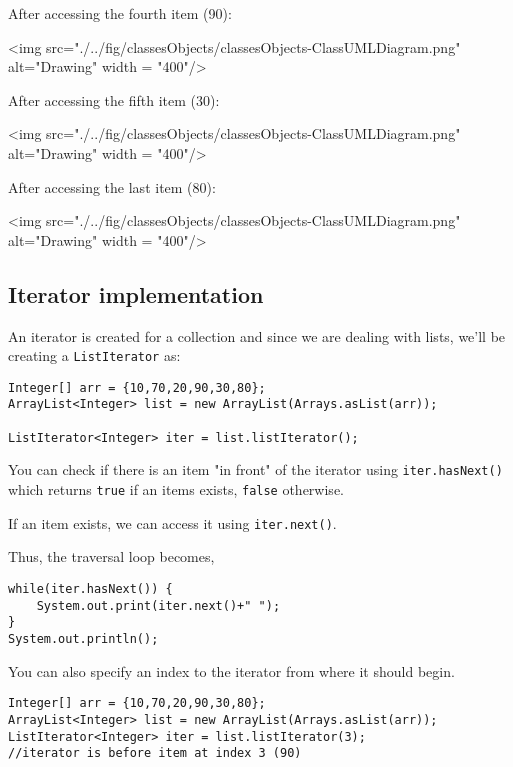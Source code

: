 After accessing the fourth item (90):
\vskip 1mm

<img src="./../fig/classesObjects/classesObjects-ClassUMLDiagram.png" alt="Drawing" width = "400"/>

\vskip 1mm

After accessing the fifth item (30):
\vskip 1mm

<img src="./../fig/classesObjects/classesObjects-ClassUMLDiagram.png" alt="Drawing" width = "400"/>

\vskip 1mm
				
After accessing the last item (80):
\vskip 1mm

<img src="./../fig/classesObjects/classesObjects-ClassUMLDiagram.png" alt="Drawing" width = "400"/>

\newpage

\subsection{Iterator implementation}

An iterator is created for a collection and since we are dealing with lists, we'll be creating a \texttt{ListIterator} as:

\begin{lstlisting}
Integer[] arr = {10,70,20,90,30,80};
ArrayList<Integer> list = new ArrayList(Arrays.asList(arr));

ListIterator<Integer> iter = list.listIterator();
\end{lstlisting}

You can check if there is an item "in front" of the iterator using \texttt{iter.hasNext()} which returns \texttt{true} if an items exists, \texttt{false} otherwise.

If an item exists, we can access it using \texttt{iter.next()}.

Thus, the traversal loop becomes,

\begin{lstlisting}
while(iter.hasNext()) {
	System.out.print(iter.next()+" ");
}
System.out.println();
\end{lstlisting}

You can also specify an index to the iterator from where it should begin.

\begin{lstlisting}
Integer[] arr = {10,70,20,90,30,80};
ArrayList<Integer> list = new ArrayList(Arrays.asList(arr));
ListIterator<Integer> iter = list.listIterator(3); 
//iterator is before item at index 3 (90)
\end{lstlisting}

